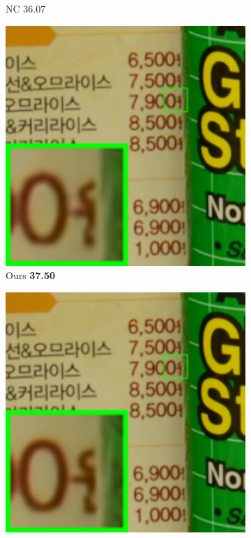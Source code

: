 \begin{figure}
\begin{subfigure}[t]{0.19\textwidth}
\caption{NC 36.07}
    \end{subfigure}
    \hfill
    \begin{subfigure}[t]{0.19\textwidth}
        \centering
        \includegraphics[width=1\textwidth]{images/guided/resize_br_Guided_CC_Noisy_Nikon_D800_ISO_3200_A3_96.png}
\caption{Ours \textbf{37.50}}
    \end{subfigure}
    \hfill
    \begin{subfigure}[t]{0.19\textwidth}
        \centering
        \includegraphics[width=1\textwidth]{images/guided/resize_br_Mean_CC_Noisy_Nikon_D800_ISO_3200_A3_96.png}

\end{subfigure}
\end{figure}
